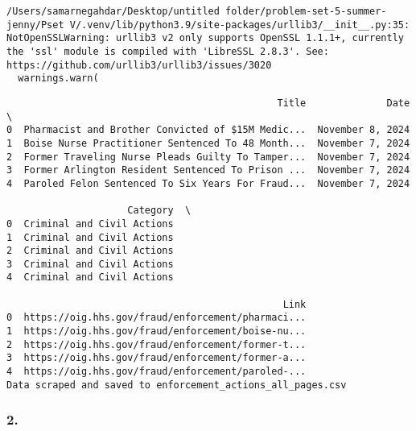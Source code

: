\documentclass[
  letterpaper,
  DIV=11,
  numbers=noendperiod]{scrartcl}
\begin{document}
\begin{verbatim}
/Users/samarnegahdar/Desktop/untitled folder/problem-set-5-summer-jenny/Pset V/.venv/lib/python3.9/site-packages/urllib3/__init__.py:35: NotOpenSSLWarning: urllib3 v2 only supports OpenSSL 1.1.1+, currently the 'ssl' module is compiled with 'LibreSSL 2.8.3'. See: https://github.com/urllib3/urllib3/issues/3020
  warnings.warn(
\end{verbatim}

\begin{verbatim}
                                               Title              Date  \
0  Pharmacist and Brother Convicted of $15M Medic...  November 8, 2024   
1  Boise Nurse Practitioner Sentenced To 48 Month...  November 7, 2024   
2  Former Traveling Nurse Pleads Guilty To Tamper...  November 7, 2024   
3  Former Arlington Resident Sentenced To Prison ...  November 7, 2024   
4  Paroled Felon Sentenced To Six Years For Fraud...  November 7, 2024   

                     Category  \
0  Criminal and Civil Actions   
1  Criminal and Civil Actions   
2  Criminal and Civil Actions   
3  Criminal and Civil Actions   
4  Criminal and Civil Actions   

                                                Link  
0  https://oig.hhs.gov/fraud/enforcement/pharmaci...  
1  https://oig.hhs.gov/fraud/enforcement/boise-nu...  
2  https://oig.hhs.gov/fraud/enforcement/former-t...  
3  https://oig.hhs.gov/fraud/enforcement/former-a...  
4  https://oig.hhs.gov/fraud/enforcement/paroled-...  
Data scraped and saved to enforcement_actions_all_pages.csv
\end{verbatim}

\subsubsection{2.}\label{section-1}
\end{document}
